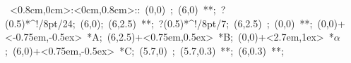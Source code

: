 
%


\hbox{
\xy    <0.8cm,0cm>:<0cm,0.8cm>::
       (0,0) ; (6,0) **\dir{-}; ?(0.5)*^!/8pt/{24};
       (6,0); (6,2.5) **\dir{-}; ?(0.5)*^!/8pt/{7}; 
       (6,2.5) ; (0,0) **\dir{-};  
       (0,0)+<-0.75em,-0.5ex> *{A};
       (6,2.5)+<0.75em,0.5ex> *{B};
       (0,0)+<2.7em,1ex> *\hbox{$\alpha$};
       (6,0)+<0.75em,-0.5ex> *{C};
	(5.7,0) ; (5.7,0.3) **\dir{-}; (6,0.3) **\dir{-};
       \endxy}
	   
